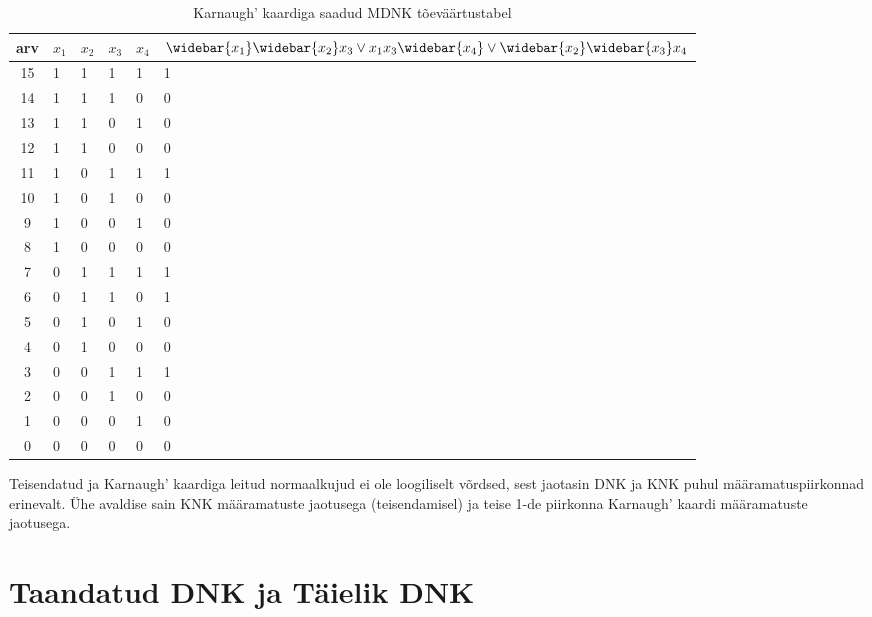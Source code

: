 \documentclass{article}
\newcommand{\wb}{\widebar}
\begin{document}
\begin{table}[H]
\centering
\caption{Karnaugh' kaardiga saadud MDNK tõeväärtustabel}
\label{my-label}
\begin{tabular}{|c|l|l|l|l||l|}
\hline
arv & $x_1$ & $x_2$ & $x_3$ & $x_4$ & $\wb{x_1}\wb{x_2}x_3 \lor x_1x_3\wb{x_4} \lor \wb{x_2}\wb{x_3}x_4$ \\\hline
15 & 1 & 1 & 1 & 1 & 1                                         \\ \hline
14 & 1 & 1 & 1 & 0 & 0                                         \\ \hline
13 & 1 & 1 & 0 & 1 & 0                                         \\ \hline
12 & 1 & 1 & 0 & 0 & 0                                         \\ \hline
11 & 1 & 0 & 1 & 1 & 1                                         \\ \hline
10 & 1 & 0 & 1 & 0 & 0                                         \\ \hline
9 & 1 & 0 & 0 & 1 & 0                                         \\ \hline
8 & 1 & 0 & 0 & 0 & 0                                         \\ \hline
7 & 0 & 1 & 1 & 1 & 1                                         \\ \hline
6 & 0 & 1 & 1 & 0 & 1                                         \\ \hline
5 & 0 & 1 & 0 & 1 & 0                                         \\ \hline
4 & 0 & 1 & 0 & 0 & 0                                         \\ \hline
3 & 0 & 0 & 1 & 1 & 1                                         \\ \hline
2 & 0 & 0 & 1 & 0 & 0                                         \\ \hline
1 & 0 & 0 & 0 & 1 & 0                                         \\ \hline
0 & 0 & 0 & 0 & 0 & 0                                         \\ \hline
\end{tabular}
\end{table}
Teisendatud ja Karnaugh' kaardiga leitud normaalkujud ei ole loogiliselt võrdsed, sest jaotasin DNK ja KNK puhul määramatuspiirkonnad erinevalt. Ühe avaldise sain KNK määramatuste jaotusega (teisendamisel) ja teise 1-de piirkonna Karnaugh' kaardi määramatuste jaotusega.
\section{Taandatud DNK ja Täielik DNK}
\end{document}
